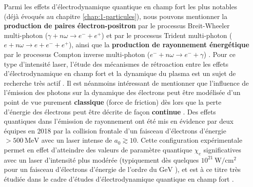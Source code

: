 \begin{refsection}
Parmi les effets d'électrodynamique quantique en champ fort les plus notables (déjà évoqués au chapitre \ref{chap:1-particules}), nous pouvons mentionner la \textbf{production de paires électron-positron} par le processus Breit-Wheeler multi-photon ($\gamma + n \omega \to e^- + e^+$) et par le processus Trident multi-photon ($e + n \omega \to e + e^- + e^+$), ainsi que la \textbf{production de rayonnement énergétique} par le processus Compton inverse multi-photon ($e^- + n \omega \to e^- + \gamma$) \parencite{dipiazza_2012}. Pour ce type d'intensité laser, l'étude des mécanismes de rétroaction entre les effets d'électrodynamique en champ fort et la dynamique du plasma est un sujet de recherche très actif \parencite{zhang_2020, capdessus_phd}. 
Il est néanmoins intéressant de mentionner que l'influence de l'émission des photons sur la dynamique des électrons peut être modélisée d'un point de vue purement \textbf{classique} (force de friction) dès lors que la perte d'énergie des électrons peut être décrite de façon \textbf{continue} \parencite{burton_2014, niel_2018}. Des effets quantiques dans l'émission de rayonnement ont été mis en évidence par deux équipes en 2018 \parencite{poder_2018, cole_2018a} par la collision frontale d'un faisceau d'électrons d'énergie $>500 ~ \si{\MeV}$ avec un laser intense de $a_0 \gtrsim 10$. Cette configuration expérimentale permet en effet d'atteindre des valeurs de paramètre quantique $\chi_e$ significatives avec un laser d'intensité plus modérée (typiquement dès quelques $10^{21} ~ \si{\W\per\cm^2}$ pour un faisceau d'électrons d'énergie de l'ordre du $\si{\GeV}$ \parencite{vranic_2014}), et est à ce titre très étudiée dans le cadre d'études d'électrodynamique quantique en champ fort \parencite{vranic_2014, dipiazza_2012, zhang_2020}. 


\end{refsection}
